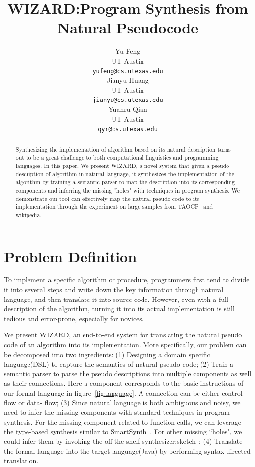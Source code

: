 \documentclass[11pt]{article}
\title{WIZARD:Program Synthesis from Natural Pseudocode}
\author{Yu Feng \\
  UT Austin \\
  {\tt yufeng@cs.utexas.edu} \\\And
  Jianyu Huang \\
  UT Austin \\
  {\tt jianyu@cs.utexas.edu}  \\\And
    Yuanru Qian \\
  UT Austin \\
  {\tt qyr@cs.utexas.edu} \\}
\date{}
\begin{document}
\maketitle
\begin{abstract}
  Synthesizing the implementation of algorithm based on its 
  natural description turns out to be a great challenge to both 
  computational linguistics and programming languages. In this paper,
  We present WIZARD, a novel system that given a pseudo description 
  of algorithm in natural language, it synthesizes the 
  implementation of the algorithm by training a semantic parser to map
  the description into its corresponding components and 
  inferring the missing ``holes" with techniques in program synthesis.  
  We demonstrate our tool can effectively
  map the natural pseudo code to its implementation through the
  experiment on large samples from TAOCP~\cite{knuth1998art} and wikipedia.
\end{abstract}

\section{Problem Definition}
To implement a specific algorithm or procedure, programmers first tend to 
divide it into several steps and write down the key information through
natural language, and then translate it into source code. However, even 
with a full description of the algorithm, turning it into its actual 
implementation is still tedious and error-prone, especially for novices.

We present WIZARD, an end-to-end system for translating the natural pseudo code
of an algorithm into its implementation. More specifically,
our problem can be decomposed into two ingredients: (1) Designing a domain 
specific language(DSL) to capture the semantics of natural pseudo code; 
(2) Train a semantic parser
 to parse the pseudo descriptions into multiple components as well as their connections. Here a 
 component corresponds to the basic instructions of our formal language in figure~\ref{fig:language}.
 A connection can be either control- flow or data- flow;
 (3) Since natural language is both ambiguous and noisy, we need to infer the missing 
 components with standard techniques in program synthesis. For the missing component
 related to function calls, we can leverage the type-based synthesis similar to SmartSynth~\cite{smartsyn}.
 For other missing ``holes", we could infer them by invoking the off-the-shelf synthesizer:sketch~\cite{sketch};
 (4) Translate the formal language into the target language(Java) by performing 
 syntax directed translation. 
  
\end{document}
